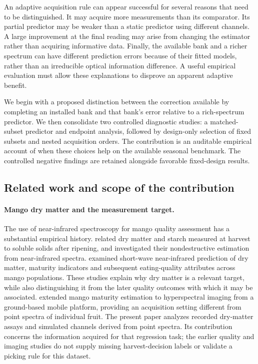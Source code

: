 \documentclass[11pt,a4paper]{article}
\begin{document}
An adaptive acquisition rule can appear successful for several reasons that need to be distinguished. It may acquire more measurements than its comparator. Its partial predictor may be weaker than a static predictor using different channels. A large improvement at the final reading may arise from changing the estimator rather than acquiring informative data. Finally, the available bank and a richer spectrum can have different prediction errors because of their fitted models, rather than an irreducible optical information difference. A useful empirical evaluation must allow these explanations to disprove an apparent adaptive benefit.

We begin with a proposed distinction between the correction available by completing an installed bank and that bank's error relative to a rich-spectrum predictor. We then consolidate two controlled diagnostic studies: a matched-subset predictor and endpoint analysis, followed by design-only selection of fixed subsets and nested acquisition orders. The contribution is an auditable empirical account of when these choices help on the available seasonal benchmark. The controlled negative findings are retained alongside favorable fixed-design results.

\subsection{Related work and scope of the contribution}
\paragraph{Mango dry matter and the measurement target.}
The use of near-infrared spectroscopy for mango quality assessment has a substantial empirical history. \citet{saranwong2004} related dry matter and starch measured at harvest to soluble solids after ripening, and investigated their nondestructive estimation from near-infrared spectra. \citet{subedi2007} examined short-wave near-infrared prediction of dry matter, maturity indicators and subsequent eating-quality attributes across mango populations. These studies explain why dry matter is a relevant target, while also distinguishing it from the later quality outcomes with which it may be associated. \citet{wendel2018} extended mango maturity estimation to hyperspectral imaging from a ground-based mobile platform, providing an acquisition setting different from point spectra of individual fruit. The present paper analyzes recorded dry-matter assays and simulated channels derived from point spectra. Its contribution concerns the information acquired for that regression task; the earlier quality and imaging studies do not supply missing harvest-decision labels or validate a picking rule for this dataset.
\end{document}
